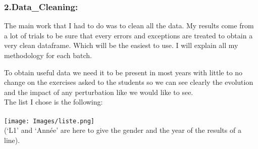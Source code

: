 \documentclass[
	12pt, %
]{fphw_assignment_toc}
\begin{document}
\newpage


\subsubsection{\large\bf 2.Data_Cleaning:}

The main work that I had to do was to clean all the data. My results come from a lot of trials to be sure that every errors and exceptions are treated to obtain a very clean dataframe. Which will be the easiest to use. I will explain all my methodology for each batch.
\\
\bigskip

To obtain useful data we need it to be present in most years with little to no change on the exercises asked to the students so we can see clearly the evolution and the impact of any perturbation like we would like to see.
\\

The list I chose is the following:
\\
\bigskip
\\
\texttt{[image: Images/liste.png]}
\\
\bigskip
(‘L1’ and ‘Année’ are here to give the gender and the year of the results of a line).
\end{document}
